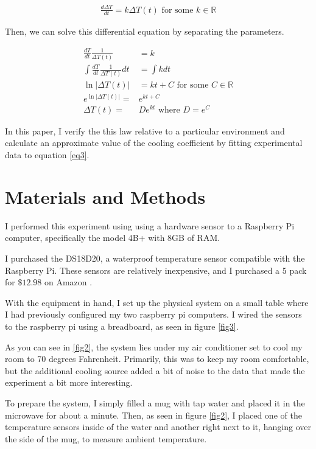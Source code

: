 \documentclass[12pt]{article}
\newcommand{\reals}{\mathbb{R}}
\begin{document}
\begin{align} \label{eq1}
	\frac{d\Delta T}{dt} = k\Delta T(t) \textrm{ for some $k \in \reals$}
\end{align}

Then, we can solve this differential equation by separating the parameters.

\begin{align} \label{eq2}
	\frac{dT}{dt}\frac{1}{\Delta T(t)} & = k \\
	\int \frac{dT}{dt}\frac{1}{\Delta T(t)} dt & = \int k dt \\
	\ln|\Delta T(t)| & = kt + C \textrm{ for some $C \in \reals$} \\
	e^{\ln | \Delta T(t) | } = & e^{kt + C} \\
	\label{eq3}
	\Delta T(t) = & De^{kt} \textrm{ where $D = e^C$ }
\end{align}

In this paper, I verify the this law
relative to a particular environment
and calculate an approximate value of the cooling coefficient
by fitting experimental data to equation \ref{eq3}.

\section{Materials and Methods}

I performed this experiment using
using a hardware sensor
to a Raspberry Pi computer,
specifically the model 4B+ with 8GB of RAM.

I purchased the DS18D20,
a waterproof temperature sensor compatible with the Raspberry Pi.
These sensors are relatively inexpensive,
and I purchased a 5 pack for $\$12.98$ on Amazon \citep{Amazon}.

With the equipment in hand,
I set up the physical system
on a small table
where I had previously configured
my two raspberry pi computers.
I wired the sensors to the raspberry pi using
a breadboard, as seen in figure \ref{fig3}.

As you can see in \ref{fig2},
the system lies under my air conditioner
set to cool my room to 70 degrees Fahrenheit.
Primarily, this was to keep my room comfortable,
but the additional cooling source added
a bit of noise to the data
that made the experiment a bit more interesting.

To prepare the system,
I simply filled a mug with tap water
and placed it in the microwave
for about a minute.
Then, as seen in figure \ref{fig2},
I placed one of the temperature sensors
inside of the water
and another right next to it,
hanging over the side of the mug,
to measure ambient temperature.
\end{document}
